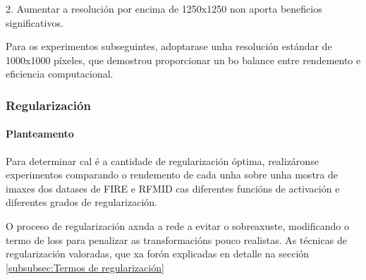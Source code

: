 2. Aumentar a resolución por encima de 1250x1250 non aporta beneficios significativos.


Para os experimentos subseguintes, adoptarase unha resolución estándar de 1000x1000 píxeles, que demostrou proporcionar un bo balance entre rendemento e eficiencia computacional.

\subsubsection{Regularización}
\label{subsubsec:Regularización}

\paragraph{Planteamento}
\label{par:Planteamento-regularization}

Para determinar cal é a cantidade de regularización óptima, realizáronse experimentos comparando o rendemento de cada unha sobre unha mostra de imaxes dos datases de FIRE e RFMID cas diferentes funcións de activación e diferentes grados de regularización.

O proceso de regularización axuda a rede a evitar o sobreaxuste, modificando o termo de loss para penalizar as transformacións pouco realistas.
As técnicas de regularización valoradas, que xa forón explicadas en detalle na sección \ref{subsubsec:Termos de regularización}


